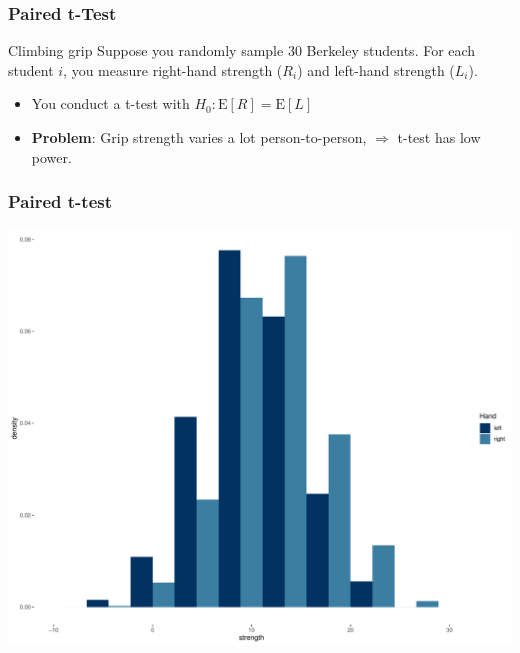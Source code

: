 \documentclass[12pt, block=fill]{beamer}
\newcommand{\E}{\text{E}}
\begin{document}
\begin{frame}
  \frametitle{Paired t-Test}

  \begin{exampleblock}{Climbing grip}
    Suppose you randomly sample 30 Berkeley students.  For each
    student $i$, you measure right-hand strength ($R_i$) and left-hand
    strength ($L_i$).

    \begin{itemize}
    \item You conduct a t-test with $H_0: \E[R] = \E[L]$
    \item \textbf{Problem}: Grip strength varies a lot
      person-to-person, $\Rightarrow$  t-test has low power.
    \end{itemize}
  \end{exampleblock}
\end{frame}

\begin{frame}
  \frametitle{Paired t-test}
  \centering
  \includegraphics[width=.9\linewidth]{./figures/histogram_unpaired.pdf}
\end{frame}
\end{document}
